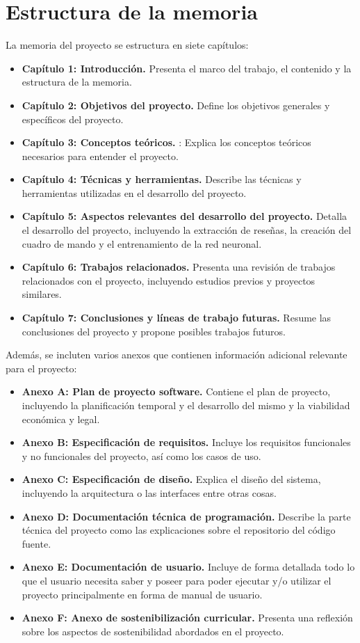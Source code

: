 \section{Estructura de la memoria}

La memoria del proyecto se estructura en siete capítulos:

\begin{itemize}
    \item \textbf{Capítulo 1: Introducción.} Presenta el marco del trabajo, el contenido y la estructura de la memoria.
    \item \textbf{Capítulo 2: Objetivos del proyecto.} Define los objetivos generales y específicos del proyecto.
    \item \textbf{Capítulo 3: Conceptos teóricos.} : Explica los conceptos teóricos necesarios para entender el proyecto.
    \item \textbf{Capítulo 4: Técnicas y herramientas.} Describe las técnicas y herramientas utilizadas en el desarrollo del proyecto.
    \item \textbf{Capítulo 5: Aspectos relevantes del desarrollo del proyecto.} Detalla el desarrollo del proyecto, incluyendo la extracción de reseñas, la creación del cuadro de mando y el entrenamiento de la red neuronal.
    \item \textbf{Capítulo 6: Trabajos relacionados.} Presenta una revisión de trabajos relacionados con el proyecto, incluyendo estudios previos y proyectos similares.
    \item \textbf{Capítulo 7: Conclusiones y líneas de trabajo futuras.} Resume las conclusiones del proyecto y propone posibles trabajos futuros.
\end{itemize}

Además, se incluten varios anexos que contienen información adicional relevante para el proyecto:

\begin{itemize}
    \item \textbf{Anexo A: Plan de proyecto software.} Contiene el plan de proyecto, incluyendo la planificación temporal y el desarrollo del mismo y la viabilidad económica y legal.
    \item \textbf{Anexo B: Especificación de requisitos.} Incluye los requisitos funcionales y no funcionales del proyecto, así como los casos de uso. 
    \item \textbf{Anexo C: Especificación de diseño.} Explica el diseño del sistema, incluyendo la arquitectura o las interfaces entre otras cosas.
    \item \textbf{Anexo D: Documentación técnica de programación.} Describe la parte técnica del proyecto como las explicaciones sobre el repositorio del código fuente.
    \item \textbf{Anexo E: Documentación de usuario.} Incluye de forma detallada todo lo que el usuario necesita saber y poseer para poder ejecutar y/o utilizar el proyecto principalmente en forma de manual de usuario.
    \item \textbf{Anexo F: Anexo de sostenibilización curricular.} Presenta una reflexión sobre los aspectos de sostenibilidad abordados en el proyecto.
\end{itemize}

